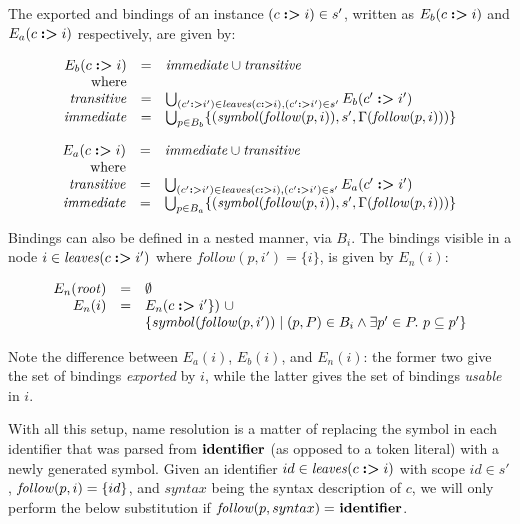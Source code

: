 \documentclass{kththesis}
\begin{document}
The exported  and  bindings of an instance $(c \mathrel{\textbf{:>}} i) \in s'$, written as $E_b(c \mathrel{\textbf{:>}} i)$ and $E_a(c \mathrel{\textbf{:>}} i)$ respectively, are given by:

$$
\begin{array}{rcl}
E_b(c \mathrel{\textbf{:>}} i) & = & \mathit{immediate} \cup \mathit{transitive} \\
\text{where} & & \\
\mathit{transitive} & = & \bigcup_{(c' \mathrel{\textbf{:>}} i') \in \mathit{leaves}(c \mathrel{\textbf{:>}} i), (c' \mathrel{\textbf{:>}} i') \in s'} E_b(c' \mathrel{\textbf{:>}} i') \\
\mathit{immediate} & = & \bigcup_{p \in B_b} \{(\mathit{symbol}(\mathit{follow}(p, i)), s', \Gamma(\mathit{follow}(p, i)))\}
\end{array}
$$

$$
\begin{array}{rcl}
E_a(c \mathrel{\textbf{:>}} i) & = & \mathit{immediate} \cup \mathit{transitive} \\
\text{where} & & \\
\mathit{transitive} & = & \bigcup_{(c' \mathrel{\textbf{:>}} i') \in \mathit{leaves}(c \mathrel{\textbf{:>}} i), (c' \mathrel{\textbf{:>}} i') \in s'} E_a(c' \mathrel{\textbf{:>}} i') \\
\mathit{immediate} & = & \bigcup_{p \in B_a} \{(\mathit{symbol}(\mathit{follow}(p, i)), s', \Gamma(\mathit{follow}(p, i)))\}
\end{array}
$$

Bindings can also be defined in a nested manner, via $B_i$. The bindings visible in a node $i \in \mathit{leaves}(c \mathrel{\textbf{:>}} i')$ where $follow(p, i') = \{i\}$, is given by $E_n(i)$:

$$
\begin{array}{rcl}
E_n(\mathit{root}) & = & \emptyset \\
E_n(i) & = & E_n(c \mathrel{\textbf{:>}} i'\})\ \cup \\
& & \{ symbol(\mathit{follow}(p, i')) \mid (p, P) \in B_i \land \exists p' \in P.\ p \subseteq p'\} \\
\end{array}
$$

Note the difference between $E_a(i)$, $E_b(i)$, and $E_n(i)$: the former two give the set of bindings \emph{exported} by $i$, while the latter gives the set of bindings \emph{usable} in $i$.


With all this setup, name resolution is a matter of replacing the symbol in each identifier that was parsed from $\mathrel{\mathbf{identifier}}$ (as opposed to a token literal) with a newly generated symbol. Given an identifier $id \in \mathit{leaves}(c \mathrel{\textbf{:>}} i)$ with scope $id \in s'$, $\mathit{follow}(p, i) = \{id\}$, and $syntax$ being the syntax description of $c$, we will only perform the below substitution if $\mathit{follow}(p, syntax) =\ \mathrel{\mathbf{identifier}}$.
\end{document}
